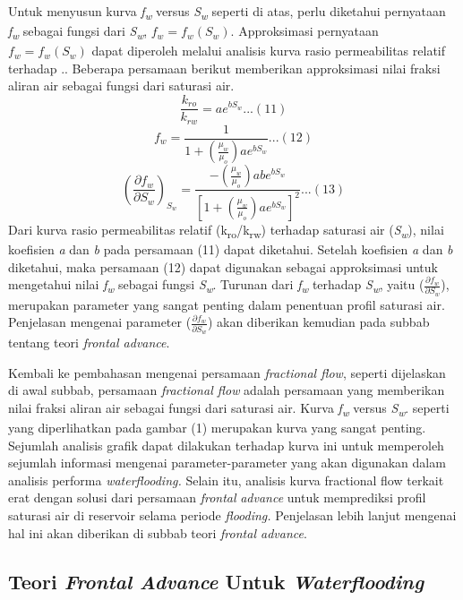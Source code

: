 \documentclass[
]{book}
\begin{document}
Untuk menyusun kurva \emph{f\textsubscript{w}} versus \emph{S\textsubscript{w}} seperti di atas, perlu diketahui pernyataan \emph{f\textsubscript{w}} sebagai fungsi dari \emph{S\textsubscript{w}}, \({f_w = f_w(S_w)}\). Approksimasi pernyataan \({f_w = f_w(S_w)}\) dapat diperoleh melalui analisis kurva rasio permeabilitas relatif terhadap .. Beberapa persamaan berikut memberikan approksimasi nilai fraksi aliran air sebagai fungsi dari saturasi air.
\[\frac{k_{ro}}{k_{rw}} = ae^{bS_w} ...(11)\]
\[f_w = \frac{1}{1+ \left( \frac{\mu_w}{\mu_o} \right)ae^{bS_w}}...(12)\]
\[\left( \frac{\partial f_w}{\partial S_w} \right)_{S_w} = \frac{- \left( \frac{\mu_w}{\mu_o} \right)abe^{bS_w}}{\left[ 1+ \left( \frac{\mu_w}{\mu_o} \right)ae^{bS_w} \right]^2}...(13)\]
Dari kurva rasio permeabilitas relatif (k\textsubscript{ro}/k\textsubscript{rw}) terhadap saturasi air (\emph{S\textsubscript{w}}), nilai koefisien \emph{a} dan \emph{b} pada persamaan (11) dapat diketahui. Setelah koefisien \emph{a} dan \emph{b} diketahui, maka persamaan (12) dapat digunakan sebagai approksimasi untuk mengetahui nilai \emph{f\textsubscript{w}} sebagai fungsi \emph{S\textsubscript{w}}. Turunan dari \emph{f\textsubscript{w}} terhadap \emph{S\textsubscript{w}}, yaitu (\(\frac{\partial f_w}{\partial S_w}\)), merupakan parameter yang sangat penting dalam penentuan profil saturasi air. Penjelasan mengenai parameter (\(\frac{\partial f_w}{\partial S_w}\)) akan diberikan kemudian pada subbab tentang teori \emph{frontal advance}.

Kembali ke pembahasan mengenai persamaan \emph{fractional flow}, seperti dijelaskan di awal subbab, persamaan \emph{fractional flow} adalah persamaan yang memberikan nilai fraksi aliran air sebagai fungsi dari saturasi air. Kurva \emph{f\textsubscript{w}} versus \emph{S\textsubscript{w}}. seperti yang diperlihatkan pada gambar (1) merupakan kurva yang sangat penting. Sejumlah analisis grafik dapat dilakukan terhadap kurva ini untuk memperoleh sejumlah informasi mengenai parameter-parameter yang akan digunakan dalam analisis performa \emph{waterflooding.} Selain itu, analisis kurva fractional flow terkait erat dengan solusi dari persamaan \emph{frontal} \emph{advance} untuk memprediksi profil saturasi air di reservoir selama periode \emph{flooding.} Penjelasan lebih lanjut mengenai hal ini akan diberikan di subbab teori \emph{frontal advance}.

\hypertarget{teori-frontal-advance-untuk-waterflooding}{%
\subsection{\texorpdfstring{Teori \emph{Frontal Advance} Untuk \emph{Waterflooding}}{Teori Frontal Advance Untuk Waterflooding}}\label{teori-frontal-advance-untuk-waterflooding}}
\end{document}
